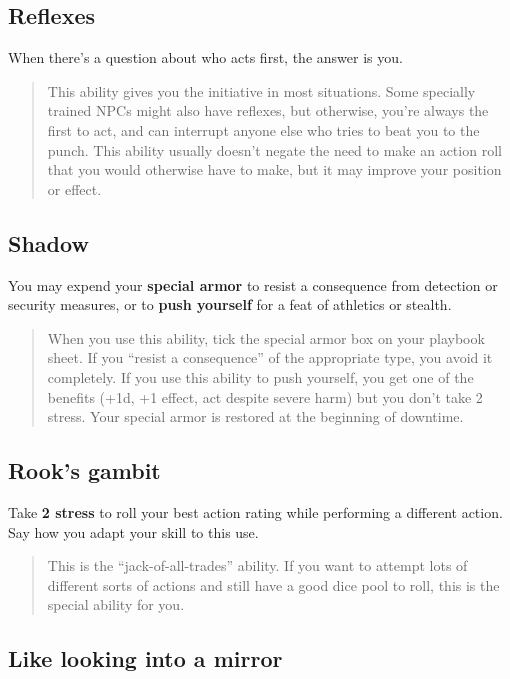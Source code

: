 \documentclass[11pt,fleqn,a5paper]{book}
\begin{document}
\subsection{Reflexes}

When there’s a question about who acts first, the answer is you.

\begin{quote}
	This ability gives you the initiative in most situations. Some specially trained NPCs might also have reflexes, but otherwise, you’re always the first to act, and can interrupt anyone else who tries to beat you to the punch. This ability usually doesn’t negate the need to make an action roll that you would otherwise have to make, but it may improve your position or effect.
\end{quote} 

\subsection{Shadow}

You may expend your \textbf{special armor} to resist a consequence from detection or security measures, or to \textbf{push yourself} for a feat of athletics or stealth.

\begin{quote}
	When you use this ability, tick the special armor box on your playbook sheet. If you “resist a consequence” of the appropriate type, you avoid it completely. If you use this ability to push yourself, you get one of the benefits (+1d, +1 effect, act despite severe harm) but you don’t take 2 stress. Your special armor is restored at the beginning of downtime.
\end{quote} 

\subsection{Rook’s gambit}

Take \textbf{2 stress} to roll your best action rating while performing a different action. Say how you adapt your skill to this use.

\begin{quote}
	This is the “jack-of-all-trades” ability. If you want to attempt lots of different sorts of actions and still have a good dice pool to roll, this is the special ability for you.
\end{quote} 

\subsection{Like looking into a mirror}
\end{document}
